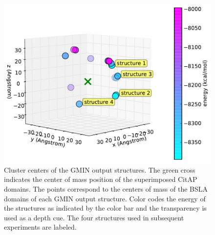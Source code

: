 \documentclass[english, a4paper, 12pt, titlepage, draft]{article}
\begin{document}
\begin{figure}
    \centering
    \includegraphics[width=1.0\textwidth]{figures/GMIN/CitA_phi_theta_3D.pdf}
    \caption{Cluster centers of the GMIN output structures. The green cross indicates the center of mass position of the superimposed CitAP domains. The points correspond to the centers of mass of the BSLA domains of each GMIN output structure. Color codes the energy of the structures as indicated by the color bar and the transparency is used as a depth cue. The four structures used in subsequent experiments are labeled.}
    \label{fig:GMIN_results}
\end{figure}       


 
\end{document}
